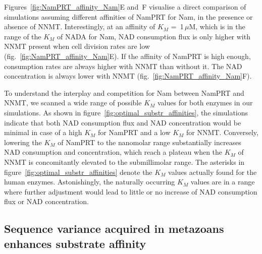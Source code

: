 Figures~\ref{fig:NamPRT_affinity_Nam}E and~F visualise a direct comparison of simulations assuming different affinities of NamPRT for Nam, in the presence or absence of NNMT. Interestingly, at an affinity of $K_{M}$ =~1\,$\mu$M, which is in the range of the $K_{M}$ of NADA for Nam, NAD consumption flux is only higher with NNMT present when cell division rates are low (fig.~\ref{fig:NamPRT_affinity_Nam}E). If the affinity of NamPRT is high enough, consumption rates are always higher with NNMT than without it. The NAD concentration is always lower with NNMT (fig.~\ref{fig:NamPRT_affinity_Nam}F).

To understand the interplay and competition for Nam between NamPRT and NNMT, we scanned a wide range of possible $K_{M}$ values for both enzymes in our simulations. As shown in figure~\ref{fig:optimal_substr_affinities}, the simulations indicate that both NAD consumption flux and NAD concentration would be minimal in case of a high $K_{M}$ for NamPRT and a low $K_{M}$ for NNMT. Conversely, lowering the $K_{M}$ of NamPRT to the nanomolar range substantially increases NAD consumption and concentration, which reach a plateau when the $K_{M}$ of NNMT is concomitantly elevated to the submillimolar range. The asterisks in figure~\ref{fig:optimal_substr_affinities} denote the $K_{M}$ values actually found for the human enzymes. Astonishingly, the naturally occurring $K_{M}$ values are in a range where further adjustment would lead to little or no increase of NAD consumption flux or NAD concentration.


\subsection{Sequence variance acquired in metazoans enhances substrate affinity}

